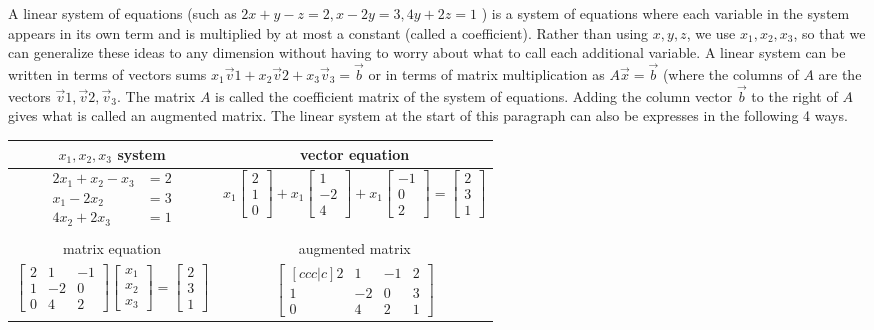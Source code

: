 \documentclass[10pt]{article}
\begin{document}
A linear system of equations 
(such as 
$2x+y-z=2,
x-2y =3,
4y+2z=1$
) is a system of equations where each variable in the system appears in its own term and is multiplied by at most a constant (called a coefficient).  Rather than using {$x,y,z$}, we use {$x_1, x_2, x_3$}, so that we can generalize these ideas to any dimension without having to worry about what to call each additional variable. A linear system can be written in terms of vectors sums $x_1\vec v1+ x_2\vec v2 + x_3\vec v_3=\vec b$ or in terms of matrix multiplication as {$A\vec x = \vec b$} (where the columns of $A$ are the vectors $\vec v1, \vec v2, \vec v_3$. The matrix $A$ is called the coefficient matrix of the system of equations. Adding the column vector $\vec b$ to the right of $A$ gives what is called an augmented matrix. The linear system at the start of this paragraph can also be expresses in the following 4 ways.
\begin{center}
\begin{tabular}{cc}
 $x_1,x_2,x_3$ system& vector equation
\\\hline\hline
$\begin{array}{rl}
2x_1+x_2-x_3&=2\\
x_1-2x_2 &=3\\
4x_2+2x_3&=1
\end{array}$
&
$ x_1\begin{bmatrix}2\\1\\0\end{bmatrix} 
+ x_1\begin{bmatrix}1\\-2\\4\end{bmatrix} 
+ x_1\begin{bmatrix}-1\\0\\2\end{bmatrix} 
=\begin{bmatrix} 2\\3\\1\end{bmatrix} 
$
\\
\\
matrix equation & augmented matrix
\\\hline\hline
$ \begin{bmatrix}2&1&-1\\1&-2&0 \\0&4&2\end{bmatrix} 
\begin{bmatrix} x_{{1}}\\x_{{2}}\\x_{{3}}\end{bmatrix}
=\begin{bmatrix} 2\\3\\1\end{bmatrix} 
$
&
$\begin{bmatrix}[ccc|c]2&1&-1 &2\\1&-2&0 &3 \\0&4&2&1\end{bmatrix}$ 
\end{tabular}
\end{center}
\end{document}
